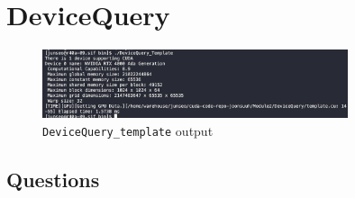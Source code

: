 \documentclass[../main.tex]{subfiles}
\begin{document}
\pagestyle{fancy}

\section*{DeviceQuery}

\begin{figure}
    [ht]
    \centering
    \includegraphics[width=0.8\textwidth]{devicequery.png}
    \caption{\texttt{DeviceQuery\_template} output}
\end{figure}

\subsection*{Questions}
\end{document}
